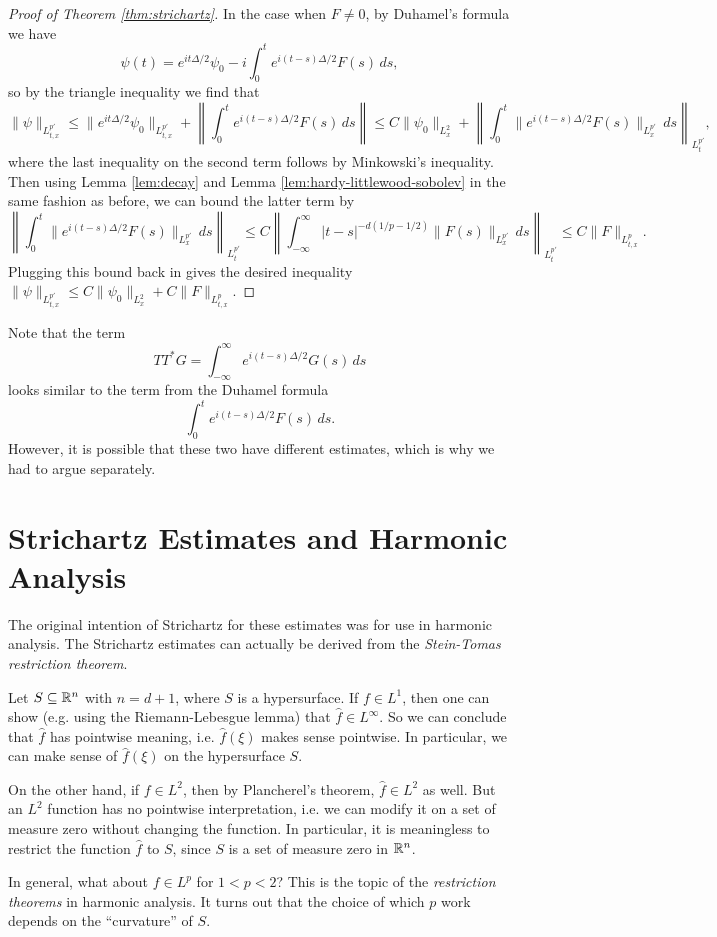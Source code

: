 \begin{proof}[Proof of Theorem \ref{thm:strichartz}]
  In the case when $F \ne 0$, by Duhamel's formula
  we have
  \[
    \psi(t) = e^{it \Delta / 2} \psi_0
    - i \int_0^t e^{i(t - s) \Delta / 2} F(s)\, ds,
  \]
  so by the triangle inequality we find that
  \[
    \|\psi\|_{L^{p'}_{t, x}}
    \le \|e^{it \Delta / 2} \psi_0\|_{L^{p'}_{t, x}}
    + \left\|
    \int_0^t e^{i(t - s) \Delta / 2} F(s)\, ds
    \right\|
    \le C \|\psi_0\|_{L^2_x}
    + \left\| \int_0^t \|e^{i(t - s)\Delta / 2} F(s)\|_{L^{p'}_x}\, ds \right\|_{L^{p'}_t},
  \]
  where the last inequality on the second term
  follows by Minkowski's inequality. Then using
  Lemma \ref{lem:decay} and Lemma \ref{lem:hardy-littlewood-sobolev} in the same fashion as before, we can bound
  the latter term by
  \[
    \left\| \int_0^t \|e^{i(t - s)\Delta / 2} F(s)\|_{L^{p'}_x}\, ds \right\|_{L^{p'}_t}
    \le
    C \left\| \int_{-\infty}^\infty |t - s|^{-d (1 / p - 1 / 2)} \|F(s)\|_{L^{p'}_x}\, ds \right\|_{L^{p'}_t}
    \le C \|F\|_{L^p_{t, x}}.
  \]
  Plugging this bound back in gives the desired
  inequality $\|\psi\|_{L^{p'}_{t, x}} \le C \|\psi_0\|_{L^2_x} + C \|F\|_{L^p_{t, x}}$.
\end{proof}

\begin{remark}
  Note that the term
  \[
    TT^* G = \int_{-\infty}^\infty e^{i(t - s) \Delta / 2} G(s)\, ds
  \]
  looks similar to the term from the Duhamel formula
  \[
    \int_0^t e^{i(t - s) \Delta / 2} F(s)\, ds.
  \]
  However, it is possible that these two have
  different estimates, which is why we had to
  argue separately.
\end{remark}

\section{Strichartz Estimates and Harmonic Analysis}
\begin{remark}
  The original intention of Strichartz for these
  estimates was for use in harmonic analysis.
  The Strichartz estimates can actually be derived
  from the \emph{Stein-Tomas restriction theorem}.

  Let $S \subseteq \mathbb{R}^n$ with $n = d + 1$, where
  $S$ is a hypersurface.
  If $f \in L^1$, then one can show (e.g.
  using the Riemann-Lebesgue lemma) that
  $\widehat{f} \in L^\infty$. So we can conclude that
  $\widehat{f}$ has pointwise meaning, i.e.
  $\widehat{f}(\xi)$ makes sense pointwise. In
  particular, we can make sense of $\widehat{f}(\xi)$
  on the hypersurface $S$.

  On the other hand, if $f \in L^2$, then by Plancherel's theorem,
  $\widehat{f} \in L^2$ as well. But
  an $L^2$ function has no pointwise interpretation,
  i.e. we can modify it on a set of measure zero without
  changing the function.
  In particular, it is meaningless to restrict
  the function $\widehat{f}$ to $S$, since $S$ is a set
  of measure zero in $\mathbb{R}^n$.

  In general, what about $f \in L^p$ for
  $1 < p < 2$? This is the topic of the
  \emph{restriction theorems} in harmonic analysis.
  It turns out that the choice of which $p$ work
  depends on the ``curvature'' of $S$.
\end{remark}

